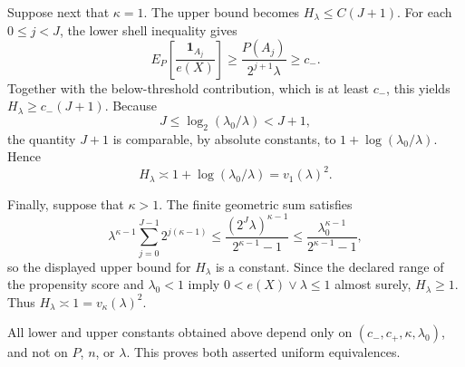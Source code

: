 Suppose next that \(\kappa=1\).  The upper bound becomes \(H_\lambda\leq C(J+1)\).  For each \(0\leq j<J\), the lower shell inequality gives
\[
 E_P\!\left[\frac{\mathbf 1_{A_j}}{e(X)}\right]
 \geq \frac{P(A_j)}{2^{j+1}\lambda}
 \geq c_-.
\]
Together with the below-threshold contribution, which is at least \(c_-\), this yields \(H_\lambda\geq c_-(J+1)\).  Because
\[
 J\leq\log_2(\lambda_0/\lambda)<J+1,
\]
the quantity \(J+1\) is comparable, by absolute constants, to \(1+\log(\lambda_0/\lambda)\).  Hence
\[
 H_\lambda\asymp 1+\log(\lambda_0/\lambda)=v_1(\lambda)^2.
\]

Finally, suppose that \(\kappa>1\).  The finite geometric sum satisfies
\[
 \lambda^{\kappa-1}\sum_{j=0}^{J-1}2^{j(\kappa-1)}
 \leq \frac{(2^J\lambda)^{\kappa-1}}{2^{\kappa-1}-1}
 \leq \frac{\lambda_0^{\kappa-1}}{2^{\kappa-1}-1},
\]
so the displayed upper bound for \(H_\lambda\) is a constant.  Since the declared range of the propensity score and \(\lambda_0<1\) imply \(0<e(X)\vee\lambda\leq1\) almost surely, \(H_\lambda\geq1\).  Thus \(H_\lambda\asymp1=v_\kappa(\lambda)^2\).

All lower and upper constants obtained above depend only on \((c_-,c_+,\kappa,\lambda_0)\), and not on \(P\), \(n\), or \(\lambda\).  This proves both asserted uniform equivalences.

